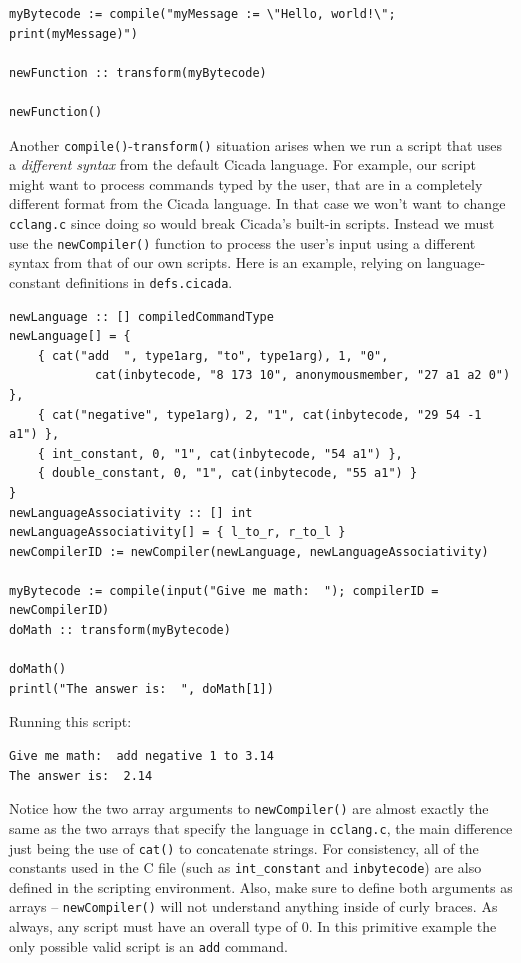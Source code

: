 \documentclass{article}
\newenvironment{code}{
       \begin{list}{}{
               \setlength{\leftmargin}{.4in}
               \setlength{\rightmargin}{0in}
               \setlength{\topsep}{.2in}
       }
       \small
       \item[] }
       { \end{list}   }
\begin{document}
\begin{code} \begin{verbatim}
myBytecode := compile("myMessage := \"Hello, world!\"; print(myMessage)")

newFunction :: transform(myBytecode)

newFunction()
\end{verbatim} \end{code}

Another \verb#compile()#-\verb#transform()# situation arises when we run a script that uses a \emph{different syntax} from the default Cicada language.  For example, our script might want to process commands typed by the user, that are in a completely different format from the Cicada language.  In that case we won't want to change \verb#cclang.c# since doing so would break Cicada's built-in scripts.  Instead we must use the \verb#newCompiler()# function to process the user's input using a different syntax from that of our own scripts.  Here is an example, relying on language-constant definitions in \verb#defs.cicada#.

\begin{code} \begin{verbatim}
newLanguage :: [] compiledCommandType
newLanguage[] = {
    { cat("add  ", type1arg, "to", type1arg), 1, "0",
            cat(inbytecode, "8 173 10", anonymousmember, "27 a1 a2 0") },
    { cat("negative", type1arg), 2, "1", cat(inbytecode, "29 54 -1 a1") },
    { int_constant, 0, "1", cat(inbytecode, "54 a1") },
    { double_constant, 0, "1", cat(inbytecode, "55 a1") }
}
newLanguageAssociativity :: [] int
newLanguageAssociativity[] = { l_to_r, r_to_l }
newCompilerID := newCompiler(newLanguage, newLanguageAssociativity)

myBytecode := compile(input("Give me math:  "); compilerID = newCompilerID)
doMath :: transform(myBytecode)

doMath()
printl("The answer is:  ", doMath[1])
\end{verbatim} \end{code}

\noindent Running this script:

\begin{code} \begin{verbatim}
Give me math:  add negative 1 to 3.14
The answer is:  2.14
\end{verbatim} \end{code}

\noindent Notice how the two array arguments to \verb#newCompiler()# are almost exactly the same as the two arrays that specify the language in \verb#cclang.c#, the main difference just being the use of \verb#cat()# to concatenate strings.  For consistency, all of the constants used in the C file (such as \verb#int_constant# and \verb#inbytecode#) are also defined in the scripting environment.  Also, make sure to define both arguments as arrays -- \verb#newCompiler()# will not understand anything inside of curly braces.  As always, any script must have an overall type of 0.  In this primitive example the only possible valid script is an \verb#add# command.
\end{document}
